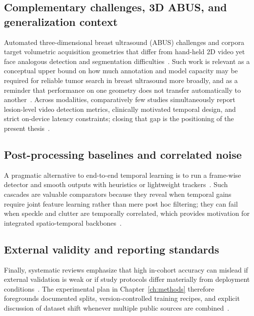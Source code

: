 \documentclass[
english,                 %
bibtex,                  %
]{kththesis}
\numberwithin{listing}{chapter}
\begin{document}
\subsection{Complementary challenges, 3D ABUS, and generalization context}
Automated three-dimensional breast ultrasound (ABUS) challenges and corpora target volumetric acquisition geometries that differ from hand-held $2\mathrm{D}$ video yet face analogous detection and segmentation difficulties~\cite{luo2025_tdsc_abus_challenge}.
Such work is relevant as a conceptual upper bound on how much annotation and model capacity may be required for reliable tumor search in breast ultrasound more broadly, and as a reminder that performance on one geometry does not transfer automatically to another~\cite{luo2025_tdsc_abus_challenge,dan2024_breast_us_dl_review}.
Across modalities, comparatively few studies simultaneously report lesion-level video detection metrics, clinically motivated temporal design, and strict on-device latency constraints; closing that gap is the positioning of the present thesis~\cite{lin2022_buv_miccai,liu2023_edgemednet}.

\subsection{Post-processing baselines and correlated noise}
A pragmatic alternative to end-to-end temporal learning is to run a frame-wise detector and smooth outputs with heuristics or lightweight trackers~\cite{lin2022_buv_miccai}.
Such cascades are valuable comparators because they reveal when temporal gains require joint feature learning rather than mere post hoc filtering; they can fail when speckle and clutter are temporally correlated, which provides motivation for integrated spatio-temporal backbones~\cite{lin2022_buv_miccai,wang2021_ultrasound_dl_review}.

\subsection{External validity and reporting standards}
Finally, systematic reviews emphasize that high in-cohort accuracy can mislead if external validation is weak or if study protocols differ materially from deployment conditions~\cite{dan2024_breast_us_dl_review}.
The experimental plan in Chapter~\ref{ch:methods} therefore foregrounds documented splits, version-controlled training recipes, and explicit discussion of dataset shift whenever multiple public sources are combined~\cite{dan2024_breast_us_dl_review,lin2022_buv_miccai}.
\end{document}

